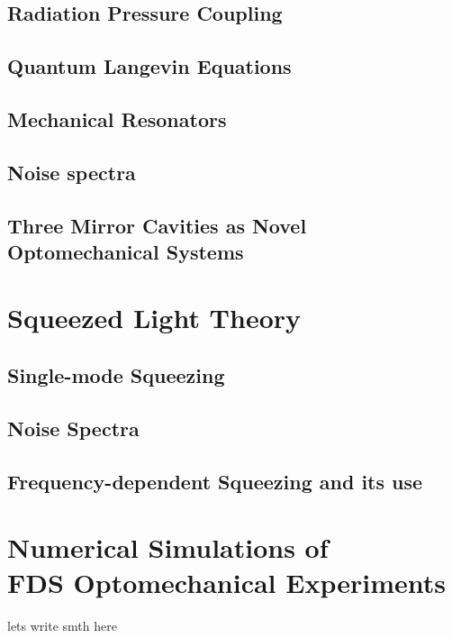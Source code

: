 \subsection{Radiation Pressure Coupling}
\subsection{Quantum Langevin Equations}
\subsection{\texorpdfstring{Mechanical Resonators}{Mechanical Resonators}}
\subsection{Noise spectra}
\subsection{\texorpdfstring{\color{red} Three Mirror Cavities as Novel Optomechanical Systems}{Three Mirror Cavities as Novel Optomechanical Systems}}
\hspace{1pt}

\section{Squeezed Light Theory}
\subsection{Single-mode Squeezing}
\subsection{Noise Spectra }
\subsection{Frequency-dependent Squeezing and its use}
\hspace{1pt}

\section{\texorpdfstring{Numerical Simulations of \\ FDS Optomechanical Experiments}{Numerical Simulations of FDS Optomechanical Experiments}}

lets write smth here 
